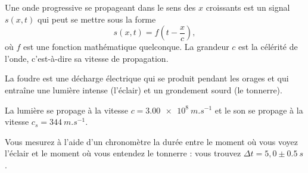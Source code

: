 \minusSmallskip



\bigskip

Une onde progressive se propageant dans le sens des $x$ croissants est un signal $s(x,t)$ qui peut se mettre sous la forme 
\[
s(x,t)=f\left(t-\dfrac{x}{c}\right),
\] où $f$ est une fonction mathématique quelconque. La grandeur $c$ est la célérité de l'onde, c'est-à-dire sa vitesse de propagation.





\hauteurLargeurCadreReponse		{8mm}{4cm}
\initialisationEntrainement

La foudre est une décharge électrique qui se produit pendant les orages et qui entraîne une lumière intense (l'éclair) et un grondement sourd (le tonnerre). 

La lumière se propage à la vitesse $c=\SI{3,00e8}{m.s^{-1}}$ et le son se propage à la vitesse $c_s= \SI{344}{m.s^{-1}}$.

Vous mesurez à l'aide d'un chronomètre la durée entre le moment où vous voyez l'éclair et le moment où vous entendez le tonnerre : vous trouvez $\Delta t=5,0 \pm \SI{0,5}{s}$.
\medskip

\debutEntrainement


